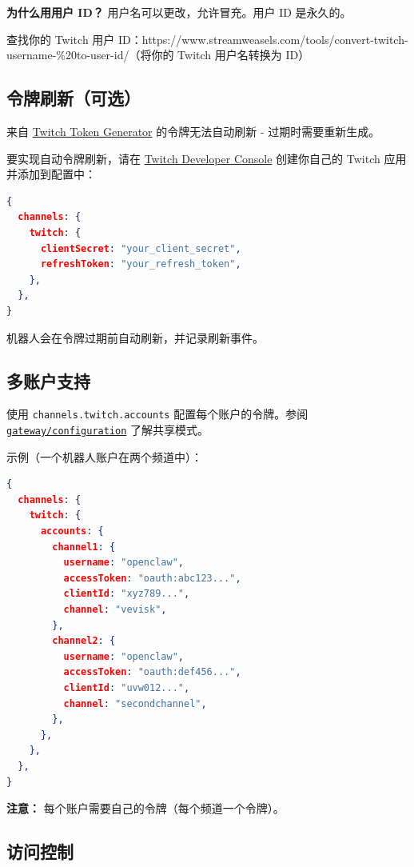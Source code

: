 \textbf{为什么用用户 ID？} 用户名可以更改，允许冒充。用户 ID 是永久的。

查找你的 Twitch 用户 ID：https://www.streamweasels.com/tools/convert-twitch-username-\%20to-user-id/（将你的 Twitch 用户名转换为 ID）

\subsection{令牌刷新（可选）}


来自 \href{https://twitchtokengenerator.com/}{Twitch Token Generator} 的令牌无法自动刷新 - 过期时需要重新生成。

要实现自动令牌刷新，请在 \href{https://dev.twitch.tv/console}{Twitch Developer Console} 创建你自己的 Twitch 应用并添加到配置中：

\begin{lstlisting}[language=json]
{
  channels: {
    twitch: {
      clientSecret: "your_client_secret",
      refreshToken: "your_refresh_token",
    },
  },
}
\end{lstlisting}


机器人会在令牌过期前自动刷新，并记录刷新事件。

\subsection{多账户支持}


使用 \texttt{channels.twitch.accounts} 配置每个账户的令牌。参阅 \href{/gateway/configuration}{\texttt{gateway/configuration}} 了解共享模式。

示例（一个机器人账户在两个频道中）：

\begin{lstlisting}[language=json]
{
  channels: {
    twitch: {
      accounts: {
        channel1: {
          username: "openclaw",
          accessToken: "oauth:abc123...",
          clientId: "xyz789...",
          channel: "vevisk",
        },
        channel2: {
          username: "openclaw",
          accessToken: "oauth:def456...",
          clientId: "uvw012...",
          channel: "secondchannel",
        },
      },
    },
  },
}
\end{lstlisting}


\textbf{注意：} 每个账户需要自己的令牌（每个频道一个令牌）。

\subsection{访问控制}


